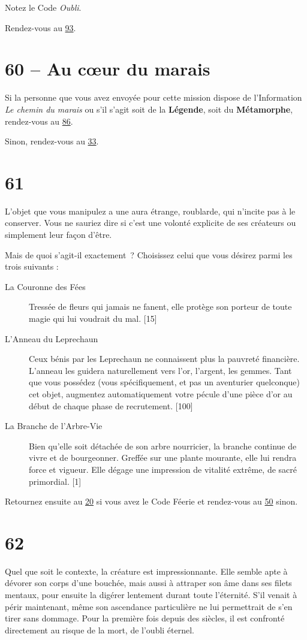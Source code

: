 \documentclass{report}
\newcommand{\gsection}[1]{
    \section{#1}
    \label{section-#1}
}
\newcommand{\glink}[1]{\hyperref[section-#1]{#1}}
\newcommand{\hero}[1]{\textbf{#1}}
\begin{document}
Notez le Code \emph{Oubli}.

Rendez-vous au \glink{93}.

\gsection{60 – Au cœur du marais}

Si la personne que vous avez envoyée pour cette mission dispose de l'Information \emph{Le chemin du marais} ou s'il s'agit soit de la \hero{Légende}, soit du \hero{Métamorphe}, rendez-vous au \glink{86}.

Sinon, rendez-vous au \glink{33}.

\gsection{61}

L'objet que vous manipulez a une aura étrange, roublarde, qui n'incite pas à le conserver. Vous ne sauriez dire si c'est une volonté explicite  de ses créateurs ou simplement leur façon d'être.

Mais de quoi s'agit-il exactement ? Choisissez celui que vous désirez parmi les trois suivants :

\begin{description}
\item[La Couronne des Fées] Tressée de fleurs qui jamais ne fanent, elle protège son porteur de toute magie qui lui voudrait du mal. [15]
\item[L'Anneau du Leprechaun] Ceux bénis par les Leprechaun ne connaissent plus la pauvreté financière. L'anneau les guidera naturellement vers l'or, l'argent, les gemmes. Tant que vous possédez (vous spécifiquement, et pas un aventurier quelconque) cet objet, augmentez automatiquement votre pécule d'une pièce d'or au début de chaque phase de recrutement. [100]
\item[La Branche de l'Arbre-Vie] Bien qu'elle soit détachée de son arbre nourricier, la branche continue de vivre et de bourgeonner. Greffée sur une plante mourante, elle lui rendra force et vigueur. Elle dégage une impression de vitalité extrême, de sacré primordial. [1]
\end{description}

Retournez ensuite au \glink{20} si vous avez le Code Féerie et rendez-vous au \glink{50} sinon.

\gsection{62}

Quel que soit le contexte, la créature est impressionnante. Elle semble apte à dévorer son corps d'une bouchée, mais aussi à attraper son âme dans ses filets mentaux, pour ensuite la digérer lentement durant toute l'éternité. S'il venait à périr maintenant, même son ascendance particulière ne lui permettrait de s'en tirer sans dommage. Pour la première fois depuis des siècles, il est confronté directement au risque de la mort, de l'oubli éternel.
\end{document}
